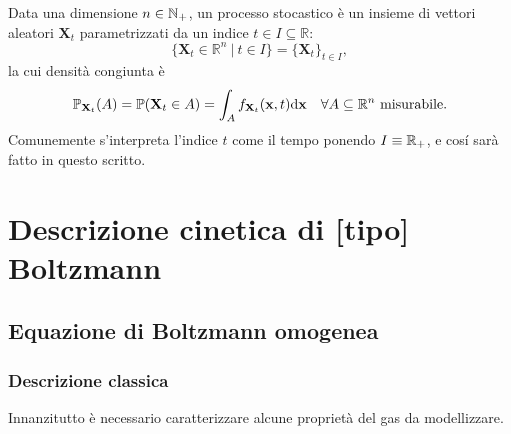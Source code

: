         \begin{dfn}
            \label{defProcessoStocastico}
            Data una dimensione \(n\in\mathbb{\mathbb N_+}\), un processo stocastico è un insieme di vettori aleatori \(\mathbf X_t\) parametrizzati da un indice \(t\in I\subseteq\mathbb R\):
            \[
                \{\mathbf X_t\in\mathbb R^n\ |\ t\in I\}=\{\mathbf X_t\}_{t\in I},
            \]
            la cui densità congiunta è
            \[
                \mathbb P_{\mathbf X_t}(A)=\mathbb P(\mathbf X_t\in A)
                =\int_Af_{\mathbf X_t}(\mathbf x,t)\mathrm{d}\mathbf x
                \quad\forall A\subseteq\mathbb R^n\text{ misurabile}.
            \]
            Comunemente s'interpreta l'indice \(t\) come il tempo ponendo \(I\equiv\mathbb R_+\), e cosí sarà fatto in questo scritto.
        \end{dfn}

    \section{Descrizione cinetica di [tipo] Boltzmann}\label{secDescrizioneCineticaClassicaETipoBoltzmann}

        \subsection{Equazione di Boltzmann omogenea}\label{secBoltzmannOmogeno}

            \subsubsection{Descrizione classica}

                Innanzitutto è necessario caratterizzare alcune proprietà del gas da modellizzare.

